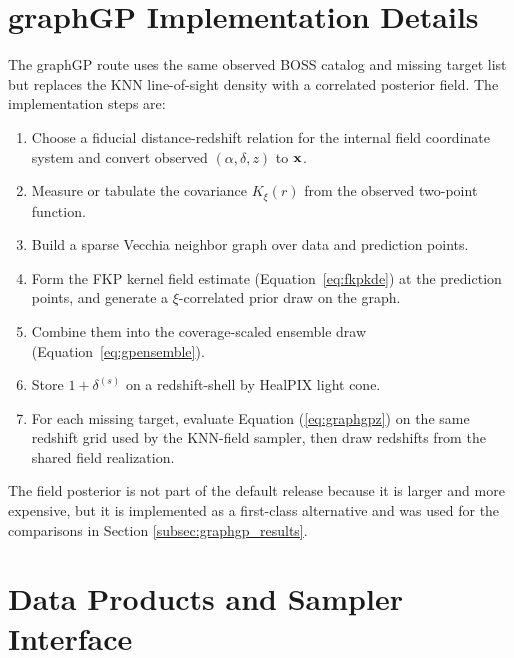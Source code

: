 \documentclass[apj]{emulateapj}
\begin{document}
\section{graphGP Implementation Details}
\label{app:graphgp}

The graphGP route uses the same observed BOSS catalog and missing target list
but replaces the KNN line-of-sight density with a correlated posterior field.
The implementation steps are:
\begin{enumerate}
\item Choose a fiducial distance-redshift relation for the internal field
coordinate system and convert observed $(\alpha,\delta,z)$ to
${\bf x}$.
\item Measure or tabulate the covariance $K_\xi(r)$ from the observed
two-point function.
\item Build a sparse Vecchia neighbor graph over data and prediction points.
\item Form the FKP kernel field estimate (Equation~\ref{eq:fkpkde}) at the
prediction points, and generate a $\xi$-correlated prior draw on the graph.
\item Combine them into the coverage-scaled ensemble draw
(Equation~\ref{eq:gpensemble}).
\item Store $1+\delta^{(s)}$ on a redshift-shell by HealPIX light cone.
\item For each missing target, evaluate Equation (\ref{eq:graphgpz}) on the
same redshift grid used by the KNN-field sampler, then draw redshifts from the
shared field realization.
\end{enumerate}
The field posterior is not part of the default release because it is larger
and more expensive, but it is implemented as a first-class alternative and was
used for the comparisons in Section \ref{subsec:graphgp_results}.

\section{Data Products and Sampler Interface}
\label{app:products}
\end{document}
